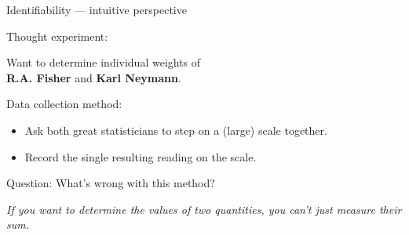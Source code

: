 
\begin{frame}{\LARGE Identifiability --- intuitive perspective}

\pause
Thought experiment:
\begin{center}
{\Large Want to determine individual weights of\\ \textbf{R.A. Fisher} \;and\; \textbf{Karl Neymann}.}
\end{center}

\vskip 0.3cm

\pause
Data collection method:
\begin{itemize}
\item	Ask both great statisticians to step on a (large) scale together.
\item	Record the single resulting reading on the scale.
\end{itemize}

\vskip 0.4cm
\pause
{\color{customRed}Question: What's wrong with this method?}

\pause
\vskip 0.15cm
\textit{\Large If you want to determine the values of two quantities, you can't just measure their sum.}

\end{frame}
\normalsize

